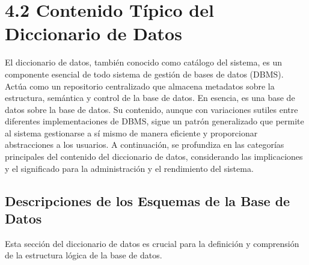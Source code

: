 \section{4.2 Contenido Típico del Diccionario de Datos}

El diccionario de datos, también conocido como catálogo del sistema, es un componente esencial de todo sistema de gestión de bases de datos (DBMS). Actúa como un repositorio centralizado que almacena metadatos sobre la estructura, semántica y control de la base de datos. En esencia, es una base de datos sobre la base de datos. Su contenido, aunque con variaciones sutiles entre diferentes implementaciones de DBMS, sigue un patrón generalizado que permite al sistema gestionarse a sí mismo de manera eficiente y proporcionar abstracciones a los usuarios. A continuación, se profundiza en las categorías principales del contenido del diccionario de datos, considerando las implicaciones y el significado para la administración y el rendimiento del sistema.

\subsection{Descripciones de los Esquemas de la Base de Datos}

Esta sección del diccionario de datos es crucial para la definición y comprensión de la estructura lógica de la base de datos.

